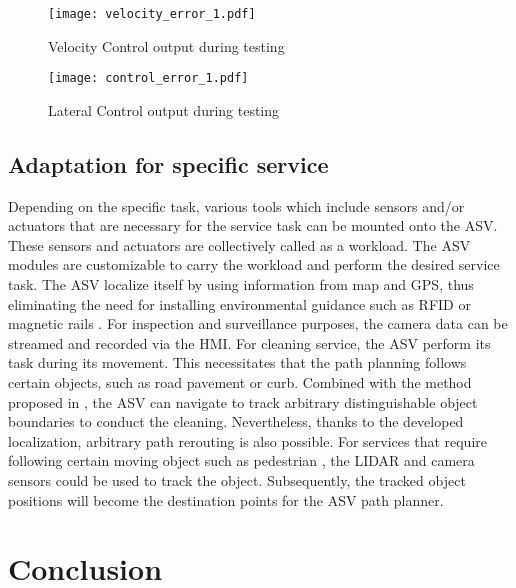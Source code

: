 \documentclass[10 pt,a4paper,conference]{IEEEtran}
\begin{document}
\begin{figure}[!t]
\centering
\texttt{[image: velocity\_error\_1.pdf]}
\caption{Velocity Control output during testing }
\label{vel_error_test}
\end{figure}

\begin{figure}[!t]
\centering
\texttt{[image: control\_error\_1.pdf]}
\caption{Lateral Control output during testing }
\label{control_error_test}
\end{figure}

\subsection{Adaptation for specific
service}\label{adaptation-for-specific-service}

Depending on the specific task, various tools which include sensors
and/or actuators that are necessary for the service task can be mounted
onto the ASV. These sensors and actuators are collectively called as a
workload. The ASV modules are customizable to carry the workload and
perform the desired service task. The ASV localize itself by using
information from map and GPS, thus eliminating the need for installing
environmental guidance such as RFID \citep{7225673} or magnetic rails
\citep{5354591}. For inspection and surveillance purposes, the camera
data can be streamed and recorded via the HMI. For cleaning service, the
ASV perform its task during its movement. This necessitates that the
path planning follows certain objects, such as road pavement or curb.
Combined with the method proposed in \citep{SongZW_IV_2015}, the ASV can
navigate to track arbitrary distinguishable object boundaries to conduct
the cleaning. Nevertheless, thanks to the developed localization,
arbitrary path rerouting is also possible. For services that require
following certain moving object such as pedestrian \citep{7139259}, the
LIDAR and camera sensors could be used to track the object.
Subsequently, the tracked object positions will become the destination
points for the ASV path planner.

\section{Conclusion}\label{conclusion}
\end{document}
